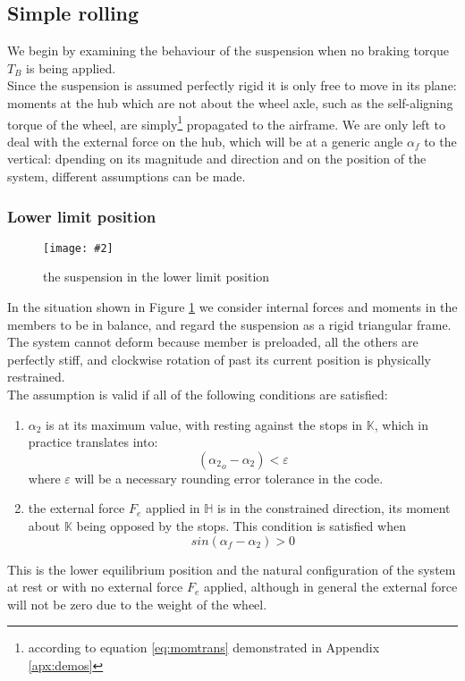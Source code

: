 \documentclass[12pt,a4paper]{report}
\newcommand*\circled[1]{
\tikz[baseline=(char.base)]{
    \node[shape=circle,draw,inner sep=1pt] (char) {#1};}
}
\newcommand{\figura}[5][htbp]{
\begin{figure}[#1]
\begin{center}
\texttt{[image: \#2]}
\caption{#4}\label{#5}
\end{center}
\end{figure}
}
\begin{document}
\subsection{Simple rolling}
We begin by examining the behaviour of the suspension when no braking torque $T_B$ is being applied.\\
Since the suspension is assumed perfectly rigid it is only free to move in its plane: moments at the hub which are not about the wheel axle, such as the self-aligning torque of the wheel, are simply\footnote{according to equation \ref{eq:momtrans} demonstrated in Appendix \ref{apx:demos}} propagated to the airframe. 
We are only left to deal with the external force on the hub, which will be at a generic angle $\alpha_f$ to the vertical: dpending on its magnitude and direction and on the position of the system, different assumptions can be made.
\subsubsection*{Lower limit position}
\figura{piczero.jpg}{}{the suspension in the lower limit position}{fig:lowerlim}

In the situation shown in Figure \ref{fig:lowerlim} we consider internal forces and moments in the members to be in balance, and regard the suspension as a rigid triangular frame. The system cannot deform because member \circled{3} is preloaded, all the others are perfectly stiff, and clockwise rotation of \circled{2} past its current position is physically restrained.\\
The assumption is valid if all of the following conditions are satisfied:
\begin{enumerate}
	\item $\alpha_2$ is at its maximum value, with \circled{2} resting against the stops in $\mathds{K}$,
	which in practice translates into:
	$$({\alpha_2}_{o} - \alpha_2 )<\varepsilon$$
	where $\varepsilon$ will be a necessary rounding error tolerance in the code.

	\item the external force $F_e$ applied in $\mathds{H}$ is in the constrained direction, its moment about $\mathds{K}$
	being opposed by the stops. This condition is satisfied when
	$$sin(\alpha_f - \alpha_2)>0$$
\end{enumerate}
This is the lower equilibrium position and the natural configuration of the system at rest or with no external force $F_e$ applied, although in general the external force will not be zero due to the weight of the wheel.
\end{document}
